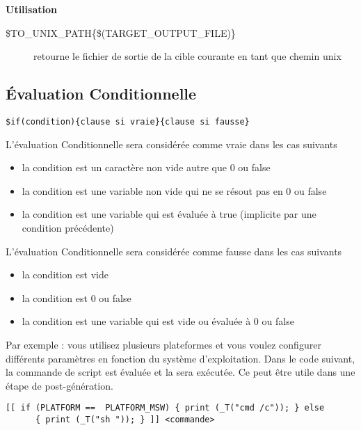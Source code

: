 \textbf{Utilisation}
\begin{description}
\item[{\footnotesize \$TO\_UNIX\_PATH\{\$(TARGET\_OUTPUT\_FILE)\}}] retourne le fichier de sortie de la cible courante en tant que chemin unix
\end{description}

\subsection{Évaluation Conditionnelle}

\begin{lstlisting}
$if(condition){clause si vraie}{clause si fausse}
\end{lstlisting}

L'évaluation Conditionnelle sera considérée comme vraie dans les cas suivants

\begin{itemize}
\item la condition est un caractère non vide autre que 0 ou false
\item la condition est une variable non vide qui ne se résout pas en 0 ou false
\item la condition est une variable qui est évaluée à true (implicite par une condition précédente)
\end{itemize}

L'évaluation Conditionnelle sera considérée comme fausse dans les cas suivants

\begin{itemize}
\item la condition est vide
\item la condition est 0 ou false
\item la condition est une variable qui est vide ou évaluée à 0 ou false
\end{itemize}



Par exemple : vous utilisez plusieurs plateformes et vous voulez configurer différents paramètres en fonction du système d'exploitation. Dans le code suivant, la commande de script \codeline{[[ ]]} est évaluée et la  sera exécutée. Ce peut être utile dans une étape de post-génération.

\begin{lstlisting}
[[ if (PLATFORM ==  PLATFORM_MSW) { print (_T("cmd /c")); } else 
      { print (_T("sh ")); } ]] <commande>
\end{lstlisting}

